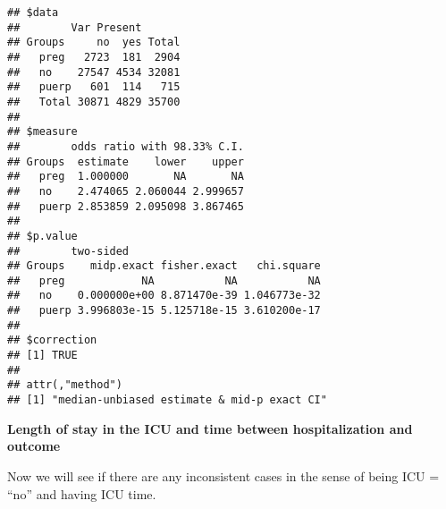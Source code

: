 \documentclass[
]{article}
\newenvironment{Shaded}{\begin{snugshade}}{\end{snugshade}}
\newcommand{\CommentTok}[1]{\textcolor[rgb]{0.56,0.35,0.01}{\textit{#1}}}
\newcommand{\DataTypeTok}[1]{\textcolor[rgb]{0.13,0.29,0.53}{#1}}
\newcommand{\KeywordTok}[1]{\textcolor[rgb]{0.13,0.29,0.53}{\textbf{#1}}}
\newcommand{\NormalTok}[1]{#1}
\newcommand{\OperatorTok}[1]{\textcolor[rgb]{0.81,0.36,0.00}{\textbf{#1}}}
\newcommand{\OtherTok}[1]{\textcolor[rgb]{0.56,0.35,0.01}{#1}}
\newcommand{\StringTok}[1]{\textcolor[rgb]{0.31,0.60,0.02}{#1}}
\begin{document}
\begin{verbatim}
## $data
##        Var Present
## Groups     no  yes Total
##   preg   2723  181  2904
##   no    27547 4534 32081
##   puerp   601  114   715
##   Total 30871 4829 35700
## 
## $measure
##        odds ratio with 98.33% C.I.
## Groups  estimate    lower    upper
##   preg  1.000000       NA       NA
##   no    2.474065 2.060044 2.999657
##   puerp 2.853859 2.095098 3.867465
## 
## $p.value
##        two-sided
## Groups    midp.exact fisher.exact   chi.square
##   preg            NA           NA           NA
##   no    0.000000e+00 8.871470e-39 1.046773e-32
##   puerp 3.996803e-15 5.125718e-15 3.610200e-17
## 
## $correction
## [1] TRUE
## 
## attr(,"method")
## [1] "median-unbiased estimate & mid-p exact CI"
\end{verbatim}

\textbf{Length of stay in the ICU and time between hospitalization and
outcome}

\begin{Shaded}
\end{Shaded}

Now we will see if there are any inconsistent cases in the sense of
being ICU = ``no'' and having ICU time.

\begin{Shaded}
\end{Shaded}
\end{document}
